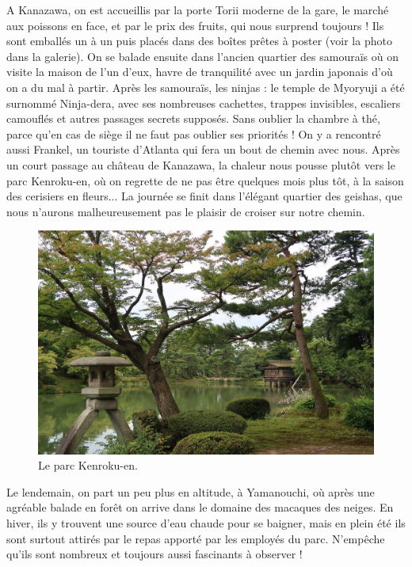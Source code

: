 A Kanazawa, on est accueillis par la porte Torii moderne de la gare, le
marché aux poissons en face, et par le prix des fruits, qui nous
surprend toujours ! Ils sont emballés un à un puis placés dans des
boîtes prêtes à poster (voir la photo dans la galerie). On se balade
ensuite dans l'ancien quartier des samouraïs où on visite la maison de
l'un d'eux, havre de tranquilité avec un jardin japonais d'où on a du
mal à partir. Après les samouraïs, les ninjas : le temple de Myoryuji a
été surnommé Ninja-dera, avec ses nombreuses cachettes, trappes
invisibles, escaliers camouflés et autres passages secrets supposés.
Sans oublier la chambre à thé, parce qu'en cas de siège il ne faut pas
oublier ses priorités ! On y a rencontré aussi Frankel, un touriste
d'Atlanta qui fera un bout de chemin avec nous. Après un court passage
au château de Kanazawa, la chaleur nous pousse plutôt vers le parc
Kenroku-en, où on regrette de ne pas être quelques mois plus tôt, à la
saison des cerisiers en fleurs... La journée se finit dans l'élégant
quartier des geishas, que nous n'aurons malheureusement pas le plaisir
de croiser sur notre chemin.

\begin{figure}
\centering
\includegraphics{images/20180723_kanazawa.JPG}
\caption{Le parc Kenroku-en.}
\end{figure}

Le lendemain, on part un peu plus en altitude, à Yamanouchi, où après
une agréable balade en forêt on arrive dans le domaine des macaques des
neiges. En hiver, ils y trouvent une source d'eau chaude pour se
baigner, mais en plein été ils sont surtout attirés par le repas apporté
par les employés du parc. N'empêche qu'ils sont nombreux et toujours
aussi fascinants à observer !

